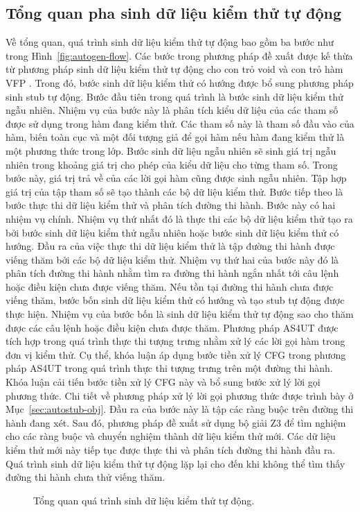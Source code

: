 \subsection{Tổng quan pha sinh dữ liệu kiểm thử tự động}
Về tổng quan, quá trình sinh dữ liệu kiểm thử tự động bao gồm ba bước như trong Hình~\autoref{fig:autogen-flow}. Các bước trong phương pháp đề xuất được kế thừa từ phương pháp sinh dữ liệu kiểm thử tự động cho con trỏ void và con trỏ hàm VFP \cite{9953784}. Trong đó, bước sinh dữ liệu kiểm thử có hướng được bổ sung phương pháp sinh stub tự động. Bước đầu tiên trong quá trình là bước sinh dữ liệu kiểm thử ngẫu nhiên. Nhiệm vụ của bước này là phân tích kiểu dữ liệu của các tham số được sử dụng trong hàm đang kiểm thử. Các tham số này là tham số đầu vào của hàm, biến toàn cục và một đối tượng giả để gọi hàm nếu hàm đang kiểm thử là một phương thức trong lớp. Bước sinh dữ liệu ngẫu nhiên sẽ sinh giá trị ngẫu nhiên trong khoảng giá trị cho phép của kiểu dữ liệu cho từng tham số. Trong bước này, giá trị trả về của các lời gọi hàm cũng được sinh ngẫu nhiên. Tập hợp giá trị của tập tham số sẽ tạo thành các bộ dữ liệu kiểm thử. Bước tiếp theo là bước thực thi dữ liệu kiểm thử và phân tích đường thi hành. Bước này có hai nhiệm vụ chính. Nhiệm vụ thứ nhất đó là thực thi các bộ dữ liệu kiểm thử tạo ra bởi bước sinh dữ liệu kiểm thử ngẫu nhiên hoặc bước sinh dữ liệu kiểm thử có hướng. Đầu ra của việc thực thi dữ liệu kiểm thử là tập đường thi hành được viếng thăm bởi các bộ dữ liệu kiểm thử. Nhiệm vụ thứ hai của bước này đó là phân tích đường thi hành nhằm tìm ra đường thi hành ngắn nhất tới câu lệnh hoặc điều kiện chưa được viếng thăm. Nếu tồn tại đường thi hành chưa được viếng thăm, bước bốn sinh dữ liệu kiểm thử có hướng và tạo stub tự động được thực hiện. Nhiệm vụ của bước bốn là sinh dữ liệu kiểm thử tự động sao cho thăm được các câu lệnh hoặc điều kiện chưa được thăm. Phương pháp AS4UT \cite{TUNG2022106821} được tích hợp trong quá trình thực thi tượng trưng nhằm xử lý các lời gọi hàm trong đơn vị kiểm thử. Cụ thể, khóa luận áp dụng bước tiền xử lý CFG trong phương pháp AS4UT trong quá trình thực thi tượng trưng trên một đường thi hành. Khóa luận cải tiến bước tiền xử lý CFG này và bổ sung bước xử lý lời gọi phương thức. Chi tiết về phương pháp xử lý lời gọi phương thức được trình bày ở Mục~\ref{sec:autostub-obj}. Đầu ra của bước này là tập các ràng buộc trên đường thi hành đang xét. Sau đó, phương pháp đề xuất sử dụng bộ giải Z3 để tìm nghiệm cho các ràng buộc và chuyển nghiệm thành dữ liệu kiểm thử mới. Các dữ liệu kiểm thử mới này tiếp tục được thực thi và phân tích đường thi hành đầu ra. Quá trình sinh dữ liệu kiểm thử tự động lặp lại cho đến khi không thể tìm thấy đường thi hành chưa thử viếng thăm.
\vspace{5mm}
\begin{figure}[hb]
	\centering
	
	\caption{Tổng quan quá trình sinh dữ liệu kiểm thử tự động.}
	\label{fig:autogen-flow}
\end{figure}

